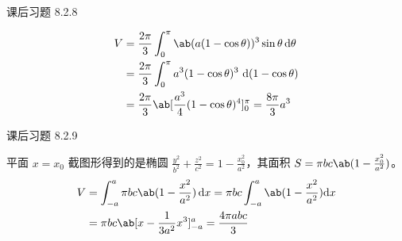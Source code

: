 \begin{problem}
	课后习题 8.2.8

	\begin{solution}
		$$
		\begin{aligned}
			V & = \frac{2\pi}{3} \int_0^\pi \ab(a (1 - \cos \theta))^3 \sin \theta \,\dd \theta \\
			& = \frac{2\pi}{3} \int_0^\pi a^3 (1 - \cos \theta)^3 \,\dd (1 - \cos \theta) \\
			& = \frac{2\pi}{3} \ab[\frac{a^3}{4} (1 - \cos \theta)^4]_0^\pi = \frac{8\pi}{3} a^3
		\end{aligned}
		$$
	\end{solution}
\end{problem}

\begin{problem}
	课后习题 8.2.9

	\begin{solution}
		平面 $x = x_0$ 截图形得到的是椭圆 $\frac{y^2}{b^2} + \frac{z^2}{c^2} = 1 - \frac{x_0^2}{a^2}$，其面积 $S = \pi b c \ab(1 - \frac{x_0^2}{a^2})$。
		$$
		\begin{aligned}
			V & = \int_{-a}^a \pi b c \ab(1 - \frac{x^2}{a^2}) \dd{x} = \pi b c \int_{-a}^a \ab(1 - \frac{x^2}{a^2}) \dd x \\
			& = \pi b c \ab[x - \frac{1}{3a^2} x^3]_{-a}^a = \frac{4\pi a b c}{3}
		\end{aligned}
		$$
	\end{solution}
\end{problem}

